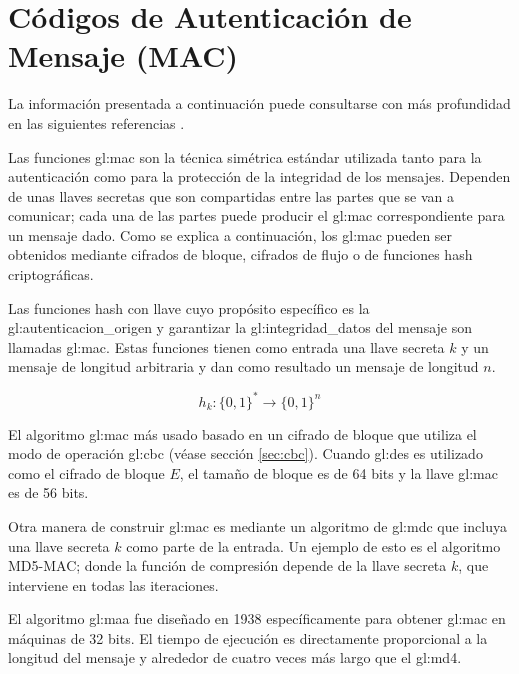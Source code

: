 %
%

\section{Códigos de Autenticación de Mensaje (MAC)}

La información presentada a continuación puede consultarse con más profundidad
en las siguientes referencias
\cite{DBLP:series/isc/DelfsK07, menezes, mac_patel}.

Las funciones \gls{gl:mac} son la técnica simétrica
estándar utilizada tanto para la autenticación como para la protección de la
integridad de los mensajes. Dependen de unas llaves secretas que son
compartidas entre las partes que se van a comunicar; cada una de las
partes puede producir el \gls{gl:mac} correspondiente para un mensaje
dado. Como se explica a continuación, los \gls{gl:mac} pueden ser
obtenidos mediante cifrados de bloque, cifrados de flujo o de funciones
hash criptográficas.

Las funciones hash con llave cuyo propósito específico es la
\gls{gl:autenticacion_origen} y garantizar la \gls{gl:integridad_datos} del
mensaje son llamadas \gls{gl:mac}. Estas funciones tienen como entrada
una llave secreta $k$ y un mensaje de longitud arbitraria y dan como resultado
un mensaje de longitud $n$.

\begin{equation}
  \label{funcion_hash_mac}
  h_k: \{0, 1\}^* \longrightarrow \{0,1\}^n
\end{equation}

El algoritmo \gls{gl:mac} más usado basado en un cifrado de bloque que
utiliza el modo de operación \gls{gl:cbc} (véase sección \ref{sec:cbc}).
Cuando \gls{gl:des} es utilizado como el cifrado de bloque $E$, el tamaño
de bloque es de 64 bits y la llave \gls{gl:mac} es de 56 bits.

Otra manera de construir \gls{gl:mac} es mediante un algoritmo
de \gls{gl:mdc} que incluya una llave secreta $k$ como parte de la
entrada. Un ejemplo de esto es el algoritmo MD5-MAC; donde la función de
compresión depende de la llave secreta $k$, que interviene en todas las
iteraciones.

El algoritmo \gls{gl:maa} fue diseñado en 1938 específicamente para
obtener \gls{gl:mac} en máquinas de 32 bits. El tiempo de ejecución
es directamente proporcional a la longitud del mensaje y alrededor de cuatro
veces más largo que el \gls{gl:md4}.

